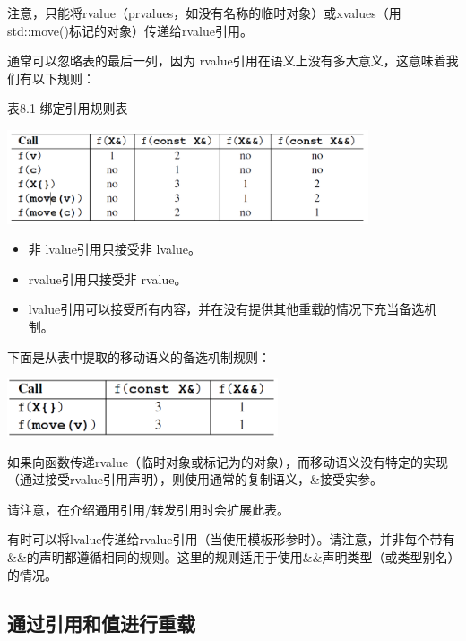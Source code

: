 注意，只能将rvalue（prvalues，如没有名称的临时对象）或xvalues（用std::move()标记的对象）传递给rvalue引用。

通常可以忽略表的最后一列，因为 rvalue引用在语义上没有多大意义，这意味着我们有以下规则：

\hspace*{\fill}  %
表8.1 绑定引用规则表

\begin{center}
	\includegraphics[width=0.8\textwidth]{part1/ch8/images/3}
\end{center}

\begin{itemize}
	\item 非 lvalue引用只接受非 lvalue。
	\item rvalue引用只接受非 rvalue。
	\item {} lvalue引用可以接受所有内容，并在没有提供其他重载的情况下充当备选机制。
\end{itemize}

下面是从表中提取的移动语义的备选机制规则：

\begin{center}
	\includegraphics[width=0.6\textwidth]{part1/ch8/images/4}
\end{center}

如果向函数传递rvalue（临时对象或标记为的对象），而移动语义没有特定的实现（通过接受rvalue引用声明），则使用通常的复制语义，\&接受实参。

请注意，在介绍通用引用/转发引用时会扩展此表。

有时可以将lvalue传递给rvalue引用（当使用模板形参时）。请注意，并非每个带有\&\&的声明都遵循相同的规则。这里的规则适用于使用\&\&声明类型（或类型别名）的情况。

\subsection{通过引用和值进行重载}

